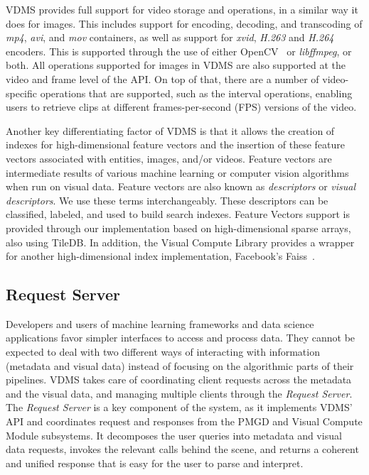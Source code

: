 VDMS provides full support for video storage and operations,
in a similar way it does for images.
This includes support for encoding, decoding, and transcoding of
\textit{mp4}, \textit{avi}, and \textit{mov} containers,
as well as support for \textit{xvid}, \textit{H.263} and \textit{H.264} encoders.
This is supported through the use of either OpenCV~\cite{opencv}
or \textit{libffmpeg}\cite{ffmpeg}, or both.
All operations supported for images in VDMS are also supported at the
video and frame level of the API.
On top of that, there are a number of video-specific operations that
are supported, such as the interval operations,
enabling users to retrieve clips at different
frames-per-second (FPS) versions of the video.

Another key differentiating factor of VDMS is that it allows the creation of
indexes for high-dimensional feature vectors and the insertion of
these feature vectors associated with entities, images, and/or videos.
Feature vectors are intermediate results of various machine
learning or computer vision algorithms when run on visual data.
Feature vectors are also known as \textit{descriptors}
or \textit{visual descriptors}.
We use these terms interchangeably.
These descriptors can be classified, labeled, and used to build search indexes.
Feature Vectors support is provided through our implementation based
on high-dimensional sparse arrays, also using TileDB.
In addition, the Visual Compute Library provides a wrapper
for another high-dimensional index implementation,
Facebook's Faiss~\cite{faiss}.

\subsection{Request Server}

Developers and users of machine learning frameworks and data science
applications favor simpler interfaces to access and process data.
They cannot be expected to deal with two different ways of interacting
with information (metadata and visual data) instead of focusing on the
algorithmic parts of their pipelines.
VDMS takes care of coordinating client requests across the metadata and the
visual data, and managing multiple clients through the \textit{Request Server}.
The \textit{Request Server} is a key component of the system,
as it implements VDMS' API and coordinates request and responses from
the PMGD and Visual Compute Module subsystems.
It decomposes the user queries into
metadata and visual data requests, invokes the relevant calls behind the scene,
and returns a coherent and unified response that is easy for the user to parse
and interpret.

